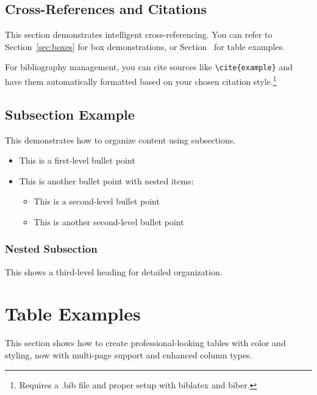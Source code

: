 \documentclass[a4paper,11pt,xetex]{article}
\begin{document}
\subsection{Cross-References and Citations}

This section demonstrates intelligent cross-referencing. You can refer to Section~\ref{sec:boxes} for box demonstrations, or Section~ for table examples.

For bibliography management, you can cite sources like \texttt{\textbackslash cite\{example\}} and have them automatically formatted based on your chosen citation style.\footnote{Requires a .bib file and proper setup with biblatex and biber.}

\subsection{Subsection Example}

This demonstrates how to organize content using subsections.

\begin{itemize}
    \item This is a first-level bullet point
    \item This is another bullet point with nested items:
    \begin{itemize}
        \item This is a second-level bullet point
        \item This is another second-level bullet point
    \end{itemize}
\end{itemize}

\subsubsection{Nested Subsection}

This shows a third-level heading for detailed organization.

\section{Table Examples}
\label{sec:tables}

This section shows how to create professional-looking tables with color and styling, now with multi-page support and enhanced column types.
\end{document}
